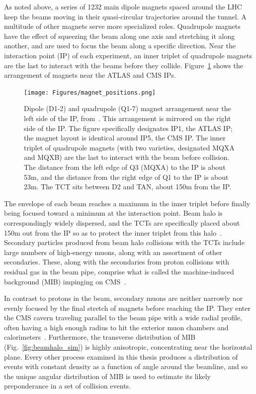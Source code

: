 As noted above, a series of 1232 main dipole magnets spaced around the LHC keep the beams moving
in their quasi-circular trajectories around the tunnel. A multitude of other magnets serve more specialized roles. Quadrupole
magnets have the effect of squeezing the beam along one axis and stretching it along another, and are used to focus
the beam along a specific direction. Near the interaction point (IP) of each experiment, an inner triplet of quadrupole magnets
are the last to interact with the beams before they collide. Figure~\ref{fig:magnet_positions} shows the arrangement
of magnets near the ATLAS and CMS IPs.

\begin{figure}[hbtp]
  \begin{center}
    \texttt{[image: Figures/magnet\_positions.png]}
    \caption{
    Dipole (D1-2) and quadrupole (Q1-7) magnet arrangement near the left side of the IP, from~\cite{ref:PAC.2003.1289077}.
    This arrangement is mirrored on the right side of the IP.
    The figure specifically designates IP1, the ATLAS IP; the magnet layout is identical around IP5, the CMS IP.
    The inner triplet of quadrupole magnets (with two varieties, designated MQXA and MQXB)
    are the last to interact with the beam before collision.
    The distance from the left edge of Q3 (MQXA) to the IP is about 53\unit{m},
    and the distance from the right edge of Q1 to the IP is about 23\unit{m}.
    The TCT sits between D2 and TAN, about 150\unit{m} from the IP.
    }
    \label{fig:magnet_positions}
  \end{center}
\end{figure}

The envelope of each beam reaches a maximum in the inner triplet
before finally being focused toward a minimum at the interaction point. Beam halo is correspondingly widely dispersed,
and the TCTs are specifically placed about 150\unit{m} out from the IP so as to protect the inner triplet from this halo~\cite{ref:PhysRevSTAB.18.061001}.
Secondary particles produced from beam
halo collisions with the TCTs include large numbers of high-energy muons, along with an assortment of other secondaries.
These, along with the secondaries from proton collisions with residual gas in the beam pipe, comprise
what is called the machine-induced background (MIB) impinging on CMS~\cite{ref:1748-0221/10/11/P11011}.

In contrast to protons in the beam, secondary muons are neither narrowly nor evenly focused by the final stretch of magnets before reaching the IP.
They enter the CMS cavern traveling parallel to the beam pipe with a wide radial profile, often having a high enough
radius to hit the exterior muon chambers and calorimeters~\cite{ref:1748-0221/10/11/P11011}.
Furthermore, the transverse distribution of MIB (Fig.~\ref{fig:beamhalo_sim}) is highly anisotropic, concentrating near the
horizontal plane. Every other process examined in this thesis produces a distribution of events with constant density as a function
of angle around the beamline, and so the unique angular distribution of MIB is used to estimate its likely preponderance in a set of collision
events.

